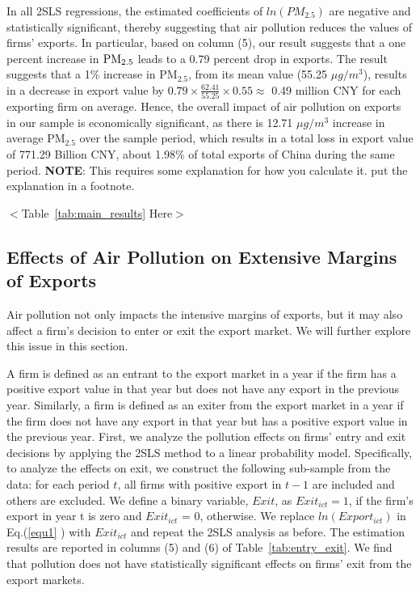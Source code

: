 \documentclass[12pt]{article}
\begin{document}
In all 2SLS regressions, the estimated coefficients of $ln(PM_{2.5})$ are
negative and statistically significant, thereby suggesting that air
pollution reduces the values of firms' exports. In particular, based on
column (5), our result suggests that a one percent increase in $\mathrm{%
PM_{2.5}}$ leads to a 0.79 percent drop in exports. The result suggests that a 1\% increase in $\mathrm{PM_{2.5}}$, from its mean value (55.25 $\mu g/m^{3}$), results in a decrease in export value by $0.79 \times \frac{62.41}
{55.25} \times 0.55 \approx $ 0.49 million CNY for each exporting firm on average. Hence, the overall impact of air pollution on exports in our sample is economically significant, as there is 12.71 $\mu g/m^{3}$ increase in average $\mathrm{PM_{2.5}}$
over the sample period, which results in a total loss in export value of 771.29 Billion CNY, about 1.98\% of total exports of China during the same period. {\color{blue} \textbf{NOTE}: This requires some explanation for how you calculate it. put the explanation in a footnote.}

\begin{center}
  $<$Table~\ref{tab:main_results} Here$>$
  \end{center}

  \subsection{Effects of Air Pollution on Extensive Margins of Exports}
   \label{sec:4.2} 
Air pollution not only impacts the intensive margins of exports, but it may also affect a firm's decision to enter or exit the export market. We will further explore this issue in this section.

A firm is defined as an entrant to the export market in a year if the firm
has a positive export value in that year but does not have any export in the
previous year. Similarly, a firm is defined as an exiter from the export
market in a year if the firm does not have any export in that year but has a
positive export value in the previous year. First, we
analyze the pollution effects on firms’ entry and exit decisions by applying the 2SLS method to a linear probability model.
Specifically, to analyze the effects on exit, we construct the following sub-sample from the data: for each period $t$, all firms with positive export in $t - 1$ are included and others are excluded. We define a binary
variable, $Exit$, as $Exit_{ict} = 1 $, if the firm’s export in year t is
zero and $Exit_{ict}$ = 0, otherwise.  We replace $ln(Export_{ict})$ in Eq.(\ref{equ1}%
) with $Exit_{ict}$ and repeat the 2SLS analysis as before. The estimation
results are reported in columns (5) and (6) of Table~\ref{tab:entry_exit}. We find that
pollution does not have statistically significant effects on firms' exit from
the export markets.
\end{document}
